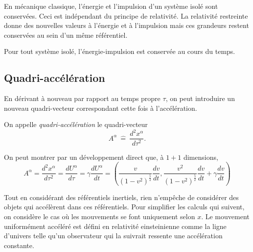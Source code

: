 \documentclass[a4paper,11pt]{report}
\begin{document}
            En mécanique classique, l'énergie et l'impulsion d'un système isolé sont conservées. Ceci est indépendant du principe de relativité. La relativité restreinte donne des nouvelles valeurs à l'énergie et à l'impulsion mais ces grandeurs restent conservées au sein d'un même référentiel.\\
            
            \begin{prin}
            \begin{leftbar}
                Pour tout système isolé, l'énergie-impulsion est conservée au cours du temps.
            \end{leftbar}
            \end{prin}
            
        \subsection{Quadri-accélération}
        
            En dérivant à nouveau par rapport au temps propre $\tau$, on peut introduire un nouveau quadri-vecteur correspondant cette fois à l'accélération.
            \begin{defn}
                On appelle \textit{quadri-accélération} le quadri-vecteur
                \begin{equation}
                    A^\alpha ~\hat{=}~ \frac{d^2x^\alpha}{d\tau^2}.
                \end{equation}
            \end{defn}
            On peut montrer par un développement direct que, à $1+1$ dimensions,
            \begin{equation}
                A^\alpha = \frac{d^2x^\alpha}{d\tau^2} = \frac{dU^\alpha}{d\tau} = \gamma\frac{dU^\alpha}{dt} = \left( \frac{v}{(1-v^2)^{\frac{5}{2}}}\frac{dv}{dt}, \frac{v^2}{(1-v^2)^{\frac{5}{2}}}\frac{dv}{dt} +\gamma \frac{dv}{dt}\right)
            \end{equation}
        
            Tout en considérant des référentiels inertiels, rien n'empêche de considérer des objets qui accélèrent dans ces référentiels. Pour simplifier les calculs qui suivent, on considère le cas où les mouvements se font uniquement selon $x$. Le mouvement uniformément accéléré est défini en relativité einsteinienne comme la ligne d'univers telle qu'un observateur qui la suivrait ressente une accélération constante.
            
\end{document}
